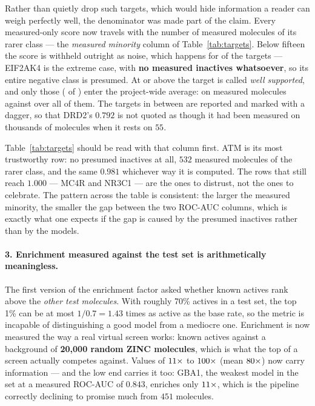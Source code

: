 Rather than quietly drop such targets, which would hide information a reader can weigh perfectly
well, the denominator was made part of the claim. Every measured-only score now travels with the
number of measured molecules of its rarer class --- the \emph{measured minority} column of
Table~\ref{tab:targets}. Below fifteen the score is withheld outright as noise, which happens for
\TgtNWithheld{} of the \TgtNModels{} targets --- EIF2AK4 is the extreme case, with
\textbf{no measured inactives whatsoever}, so its entire negative class is presumed. At or above
\TgtMinMinority{} the target is called \emph{well supported}, and only those
(\TgtNWellSupported{} of \TgtNModels) enter the project-wide average: \TgtAUCMeasured{} on
measured molecules against \TgtAUC{} over all of them. The \TgtNThin{} targets in between are
reported and marked with a dagger, so that DRD2's $0.792$ is not quoted as though it had been
measured on thousands of molecules when it rests on $55$.

Table~\ref{tab:targets} should be read with that column first. ATM is its most trustworthy row:
no presumed inactives at all, $532$ measured molecules of the rarer class, and the same $0.981$
whichever way it is computed. The rows that still reach $1.000$ --- MC4R and NR3C1 --- are the
ones to distrust, not the ones to celebrate. The pattern across the table is consistent: the
larger the measured minority, the smaller the gap between the two ROC-AUC columns, which is
exactly what one expects if the gap is caused by the presumed inactives rather than by the
models.


\paragraph{3. Enrichment measured against the test set is arithmetically meaningless.} The first
version of the enrichment factor asked whether known actives rank above the \emph{other test
molecules}. With roughly 70\% actives in a test set, the top 1\% can be at most $1/0.7 = 1.43$
times as active as the base rate, so the metric is incapable of distinguishing a good model from a
mediocre one. Enrichment is now measured the way a real virtual screen works: known actives
against a background of \textbf{20{,}000 random ZINC molecules}, which is what the top of a screen
actually competes against. Values of $11\times$ to $100\times$ (mean
$80\times$) now carry information --- and the low end carries it too: GBA1, the weakest model
in the set at a measured ROC-AUC of $0.843$, enriches only $11\times$, which is the
pipeline correctly declining to promise much from $451$ molecules.

